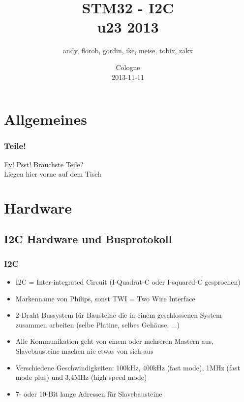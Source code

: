 \documentclass[ngerman,compress]{beamer}
\title[STM32 - I2C - u23 2013]
{\textbf{STM32 - I2C}\\u23 2013}
\author[andy <andy@koeln.ccc.de>]
{andy, florob, gordin, ike, meise, tobix, zakx}
\institute[Chaos Computer Club Cologne]
{
Chaos Computer Club Cologne e.V.\\
http://koeln.ccc.de \\
}
\date{Cologne\\2013-11-11}
\begin{document}
\begin{frame}
  \titlepage
\end{frame}

\AtBeginSubsection

\begin{frame}
  \tableofcontents
\end{frame}

\section {Allgemeines}

\begin{frame}
	\frametitle{Teile!}
	\begin{center}
	\huge{Ey! Psst! Brauchste Teile?} \\
	\large{Liegen hier vorne auf dem Tisch}
	\end{center}
\end{frame}

\section{Hardware}

\subsection{I2C Hardware und Busprotokoll}

\begin{frame}
	\frametitle{I2C}
	\begin{itemize}
		\item I2C = Inter-integrated Circuit (I-Quadrat-C oder I-squared-C gesprochen)
		\item Markenname von Philips, sonst TWI = Two Wire Interface
		\item 2-Draht Bussystem für Bausteine die in einem geschlossenen System zusammen arbeiten (selbe Platine, selbes Gehäuse, ...)
		\item Alle Kommunikation geht von einem oder mehreren Mastern aus, Slavebausteine machen nie etwas von sich aus
		\item Verschiedene Geschwindigkeiten: 100kHz, 400kHz (fast mode), 1MHz (fast mode plus) und 3,4MHz (high speed mode)
		\item 7- oder 10-Bit lange Adressen für Slavebausteine
	\end{itemize}
\end{frame}
\end{document}
